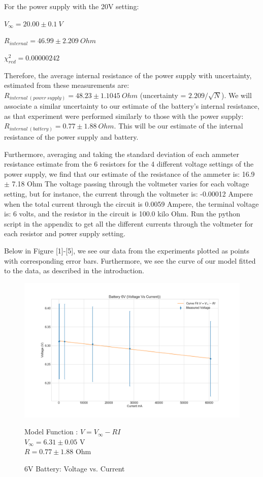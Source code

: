 \documentclass[letterpaper,12pt]{article}
\begin{document}
For the power supply with the 20V setting:

$V_{\infty} = 20.00 \pm 0.1\ V$

$R_{internal} = 46.99 \pm 2.209\ Ohm$

$\chi_{red}^2 = 0.00000242$

Therefore, the average internal resistance of the power supply with uncertainty, 
estimated from these measurements are:
$R_{internal\ (power\ supply)} = 48.23 \pm 1.1045\ Ohm$ (uncertainty = $2.209/\sqrt{N}$).
We will associate a similar uncertainty to our estimate of the battery’s internal resistance, as that experiment were performed similarly to those with the power supply:
$R_{internal\ (battery)} = 0.77 \pm 1.88\ Ohm$.
This will be our estimate of the internal resistance of the power supply and battery.

Furthermore, averaging and taking the standard deviation of each ammeter resistance
 estimate from the 6 resistors for the 4 different voltage settings of the power 
 supply, we find that our estimate of the resistance of the ammeter is: 16.9 $\pm$ 7.18 Ohm
The voltage passing through the voltmeter varies for each voltage setting, but for 
instance, the current through the voltmeter is: -0.00012 Ampere when the total current through the 
circuit is 0.0059 Ampere, the terminal voltage is: 6 volts, and the resistor in the circuit is 100.0 kilo Ohm.
Run the python script in the appendix to get all the different currents through the voltmeter for each resistor and power supply setting.

Below in Figure [1]-[5], we see our data from the experiments plotted as points with corresponding error bars. Furthermore, we see the curve of our model fitted to the data, as described in the introduction. 

\begin{figure}[H]
  \centering
  \includegraphics[width=0.95\linewidth]{../code/Fredrik/6V battery lab5_voltage_vs_current.png}    
  \begin{center}
    \begin{center}
      Model Function : $V = V_{\infty} - RI$ \\
      $V_{\infty} = 6.31 \pm 0.05 $ V\\
      $R = 0.77 \pm 1.88$ Ohm\\
    \end{center}  \end{center}
  \caption{6V Battery: Voltage vs. Current}
  \label{battery-v-i}
\end{figure}
\end{document}
